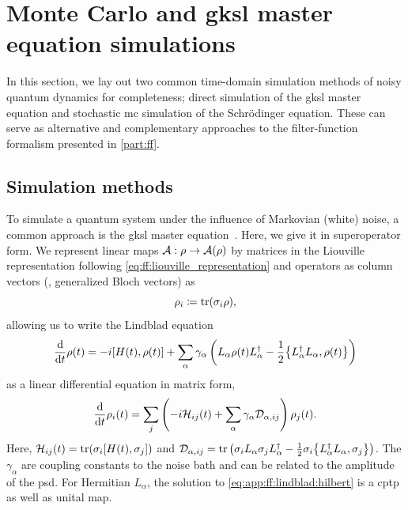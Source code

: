 \section{Monte Carlo and \texorpdfstring{\acrshort{gksl}}{GKSL} master equation simulations}\label{sec:app:ff:time_domain_methods}
In this section, we lay out two common time-domain simulation methods of noisy quantum dynamics for completeness; direct simulation of the \gls{gksl} master equation and stochastic \gls{mc} simulation of the Schrödinger equation.
These can serve as alternative and complementary approaches to the filter-function formalism presented in \cref{part:ff}.

\subsection{Simulation methods}\label{subsec:app:ff:time_domain_methods:methods}
To simulate a quantum system under the influence of Markovian (white) noise, a common approach is the \gls{gksl} master equation~\cite{Lindblad1976,Gorini1976}.
Here, we give it in superoperator form.
We represent linear maps $\mathcal{A}: \rho\rightarrow\mathcal{A}(\rho)$ by matrices in the Liouville representation following \cref{eq:ff:liouville_representation}
and operators as column vectors (\ie, generalized Bloch vectors) as
\begin{equation}\label{eq:app:ff:bloch_vector}
    \rho_i \coloneqq \tr(\sigma_i\rho),
\end{equation}
allowing us to write the Lindblad equation
\begin{equation}\label{eq:app:ff:lindblad:hilbert}
    \dv{t}\rho(t) = -\i\comm{H(t)}{\rho(t)} + \sum_\alpha \gamma_\alpha\left(L_\alpha\rho(t) L_\alpha\adjoint - \frac{1}{2}\acomm{L_\alpha\adjoint L_\alpha}{\rho(t)}\right)
\end{equation}
as a linear differential equation in matrix form,
\begin{equation}\label{eq:app:ff:lindlbad:liouville}
    \dv{t}\rho_i(t) = \sum_j\left(-i\mathcal{H}_{ij}(t)+ \sum_\alpha \gamma_\alpha \mathcal{D}_{\alpha, ij}\right)\rho_j(t).
\end{equation}
Here, $\mc{H}_{ij}(t) = \tr(\sigma_i\comm{H(t)}{\sigma_j})$ and $\mc{D}_{\alpha, ij} = \tr\left(\sigma_i L_\alpha\sigma_j L_\alpha\adjoint - \frac{1}{2}\sigma_i \acomm{L_\alpha\adjoint L_\alpha}{\sigma_j}\right)$.
The $\gamma_\alpha$ are coupling constants to the noise bath and can be related to the amplitude of the \gls{psd}.
For Hermitian $L_\alpha$, the solution to \cref{eq:app:ff:lindblad:hilbert} is a \gls{cptp} as well as unital map.
